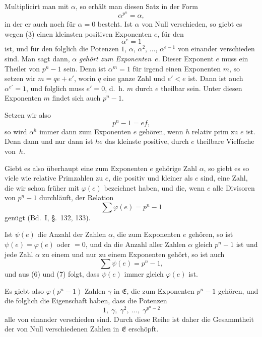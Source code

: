 \documentclass[12pt,a4paper]{article}
\begin{document}
Multiplicirt man mit $\alpha$, so erhält man diesen Satz in der Form
\begin{equation}\label{eq:64.4}
\tag{4}
\alpha^{p^{n}} = \alpha,
\end{equation}
in der er auch noch für $\alpha = 0$ besteht. Ist $\alpha$ von Null verschieden, so giebt es wegen (3) einen kleinsten positiven Exponenten $e$, für den
\begin{equation}\label{eq:64.5}
\tag{5}
\alpha^{e} = 1
\end{equation}
ist, und für den folglich die Potenzen $1$, $\alpha$, $\alpha^{2}$, $\ldots$, $\alpha^{e-1}$ von einander verschieden sind. Man sagt dann, $\alpha$ \emph{gehört zum Exponenten}~$e$. Dieser Exponent $e$ muss ein Theiler von $p^{n} - 1$ sein. Denn ist $\alpha^{m} = 1$ für irgend einen Exponenten $m$, so setzen wir $m = qe + e'$, worin $q$ eine ganze Zahl und $e' < e$ ist. Dann ist auch $\alpha^{e'} = 1$, und folglich muss $e' = 0$, d.~h. $m$ durch $e$ theilbar sein. Unter diesen Exponenten $m$ findet sich auch $p^{n} - 1$.

Setzen wir also
\[
p^{n} - 1 = ef,
\]
so wird $\alpha^{h}$ immer dann zum Exponenten $e$ gehören, wenn $h$ relativ prim zu $e$ ist. Denn dann und nur dann ist $he$ das kleinste positive, durch $e$ theilbare Vielfache von~$h$.

\newpage
{}

Giebt es also überhaupt eine zum Exponenten $e$ gehörige Zahl $\alpha$, so giebt es so viele wie relative Primzahlen zu $e$, die positiv und kleiner als $e$ sind, eine Zahl, die wir schon früher mit $\varphi(e)$ bezeichnet haben, und die, wenn $e$ alle Divisoren von $p^{n} - 1$ durchläuft, der Relation
\begin{equation}\label{eq:64.6}
\tag{6}
\sum \varphi(e) = p^{n} - 1
\end{equation}
genügt (Bd.~I, \S.~132, 133).

Ist $\psi(e)$ die Anzahl der Zahlen $\alpha$, die zum Exponenten $e$ gehören, so ist $\psi(e) = \varphi(e)$ oder $= 0$, und da die Anzahl aller Zahlen $\alpha$ gleich $p^{n} - 1$ ist und jede Zahl $\alpha$ zu einem und nur zu einem Exponenten gehört, so ist auch
\begin{equation}\label{eq:64.7}
\tag{7}
\sum \psi(e) = p^{n} - 1,
\end{equation}
und aus (6) und (7) folgt, dass $\psi(e)$ immer gleich $\varphi(e)$ ist.

Es giebt also $\varphi(p^{n} - 1)$ Zahlen $\gamma$ in $\mathfrak{E}$, die zum Exponenten $p^{n} - 1$ gehören, und die folglich die Eigenschaft haben, dass die Potenzen
\begin{equation}\label{eq:64.8}
\tag{8}
1,\; \gamma,\; \gamma^{2},\; \ldots,\; \gamma^{p^{n}-2}
\end{equation}
alle von einander verschieden sind. Durch diese Reihe ist daher die Gesammtheit der von Null verschiedenen Zahlen in $\mathfrak{E}$ erschöpft.
\end{document}
